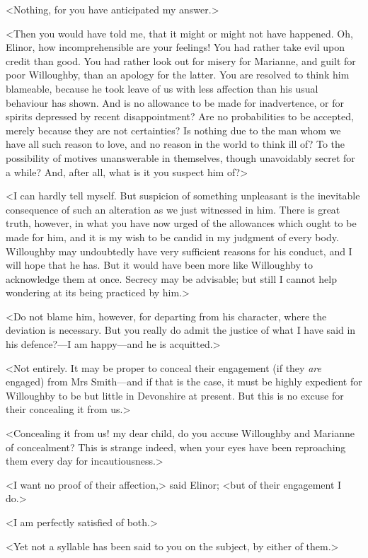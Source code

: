 <Nothing, for you have anticipated my answer.>

<Then you would have told me, that it might or might not have happened. Oh, Elinor, how incomprehensible are your feelings! You had rather take evil upon credit than good. You had rather look out for misery for Marianne, and guilt for poor Willoughby, than an apology for the latter. You are resolved to think him blameable, because he took leave of us with less affection than his usual behaviour has shown. And is no allowance to be made for inadvertence, or for spirits depressed by recent disappointment? Are no probabilities to be accepted, merely because they are not certainties? Is nothing due to the man whom we have all such reason to love, and no reason in the world to think ill of? To the possibility of motives unanswerable in themselves, though unavoidably secret for a while? And, after all, what is it you suspect him of?>

<I can hardly tell myself. But suspicion of something unpleasant is the inevitable consequence of such an alteration as we just witnessed in him. There is great truth, however, in what you have now urged of the allowances which ought to be made for him, and it is my wish to be candid in my judgment of every body. Willoughby may undoubtedly have very sufficient reasons for his conduct, and I will hope that he has. But it would have been more like Willoughby to acknowledge them at once. Secrecy may be advisable; but still I cannot help wondering at its being practiced by him.>

<Do not blame him, however, for departing from his character, where the deviation is necessary. But you really do admit the justice of what I have said in his defence?—I am happy—and he is acquitted.>

<Not entirely. It may be proper to conceal their engagement (if they \textit{are} engaged) from Mrs Smith—and if that is the case, it must be highly expedient for Willoughby to be but little in Devonshire at present. But this is no excuse for their concealing it from us.>

<Concealing it from us! my dear child, do you accuse Willoughby and Marianne of concealment? This is strange indeed, when your eyes have been reproaching them every day for incautiousness.>

<I want no proof of their affection,> said Elinor; <but of their engagement I do.>

<I am perfectly satisfied of both.>

<Yet not a syllable has been said to you on the subject, by either of them.>


